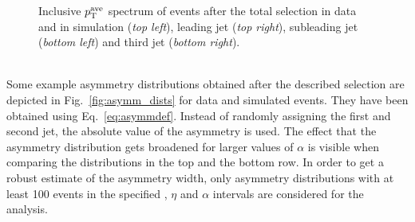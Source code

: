 \begin{figure}[!tp]
\begin{tabular}{cc}
  \end{tabular}
  \caption{Inclusive $p_{\text{T}}^\mathrm{ave}$ spectrum of events after the total selection in data and in simulation (\textit{top left}), leading jet \pt (\textit{top right}), subleading jet \pt (\textit{bottom left}) and third jet \pt (\textit{bottom right}).}
  \label{fig:ptave_spec}
\end{figure}
\\
Some example asymmetry distributions obtained after the described selection are depicted in Fig.~\ref{fig:asymm_dists} for data and simulated events. They have been obtained using Eq.~\ref{eq:asymmdef}. Instead of randomly assigning the first and second jet, the absolute value of the asymmetry is used. The effect that the asymmetry distribution gets broadened for larger values of $\alpha$ is visible when comparing the distributions in the top and the bottom row. In order to get a robust estimate of the asymmetry width, only asymmetry distributions with at least 100 events in the specified \ptave, $\eta$ and $\alpha$ intervals are considered for the analysis. 
